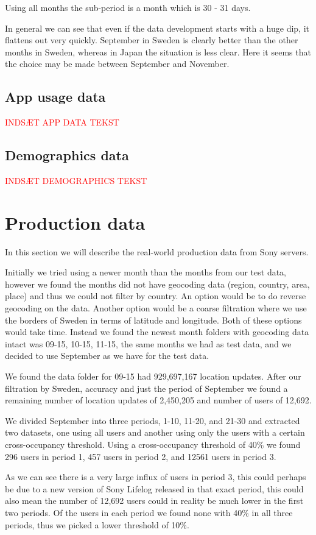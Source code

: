 Using all months the sub-period is a month which is 30 - 31 days. 

In general we can see that even if the data development starts with a huge dip, it flattens out very quickly. September in Sweden is clearly better than the other months in Sweden, whereas in Japan the situation is less clear. Here it seems that the choice may be made between September and November. 



\subsection{App usage data}
\textcolor{red}{INDSÆT APP DATA TEKST}
\subsection{Demographics data}
\textcolor{red}{INDSÆT DEMOGRAPHICS TEKST}

\section{Production data}
In this section we will describe the real-world production data from Sony servers.

Initially we tried using a newer month than the months from our test data, however we found the months did not have geocoding data (region, country, area, place) and thus we could not filter by country. An option would be to do reverse geocoding on the data. Another option would be a coarse filtration where we use the borders of Sweden in terms of latitude and longitude. Both of these options would take time. Instead we found the newest month folders with geocoding data intact was 09-15, 10-15, 11-15, the same months we had as test data, and we decided to use September as we have for the test data.

We found the data folder for 09-15 had 929,697,167 location updates. After our filtration by Sweden, accuracy and just the period of September we found a remaining number of location updates of 2,450,205 and number of users of 12,692.

We divided September into three periods, 1-10, 11-20, and 21-30 and extracted two datasets, one using all users and another using only the users with a certain cross-occupancy threshold. Using a cross-occupancy threshold of 40\% we found 296 users in period 1, 457 users in period 2, and 12561 users in period 3.

As we can see there is a very large influx of users in period 3, this could perhaps be due to a new version of Sony Lifelog released in that exact period, this could also mean the number of 12,692 users could in reality be much lower in the first two periods. Of the users in each period we found none with 40\% in all three periods, thus we picked a lower threshold of 10\%.




